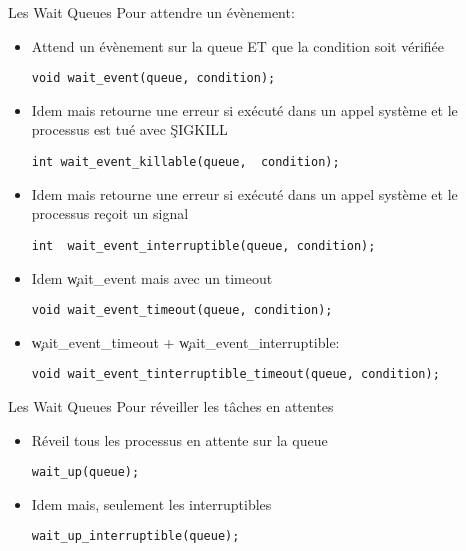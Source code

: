 \begin{frame}[fragile=singleslide]{Les Wait Queues}
  Pour attendre un évènement:
    \begin{itemize}
    \item Attend  un évènement sur la  queue ET que  la condition soit
      vérifiée
      \begin{lstlisting}
void wait_event(queue, condition);
      \end{lstlisting}
    \item  Idem mais  retourne une  erreur  si exécuté  dans un  appel
      système et le processus est tué avec \c{SIGKILL}
      \begin{lstlisting}
int wait_event_killable(queue,  condition);
      \end{lstlisting}
    \item  Idem mais  retourne une  erreur  si exécuté  dans un  appel
      système et le processus reçoit un signal
      \begin{lstlisting}
int  wait_event_interruptible(queue, condition);
      \end{lstlisting}
    \item   Idem \c{wait_event} mais avec un timeout
      \begin{lstlisting}
void wait_event_timeout(queue, condition);
      \end{lstlisting}
    \item \c{wait_event_timeout} + \c{wait_event_interruptible}:
      \begin{lstlisting}
void wait_event_tinterruptible_timeout(queue, condition);
      \end{lstlisting}
    \end{itemize}
\end{frame}

\begin{frame}[fragile=singleslide]{Les Wait Queues}
  Pour réveiller les tâches en attentes
    \begin{itemize}
    \item Réveil tous les processus en attente sur la queue
      \begin{lstlisting}
wait_up(queue);
      \end{lstlisting}
    \item Idem mais, seulement les interruptibles
      \begin{lstlisting}
wait_up_interruptible(queue);
      \end{lstlisting}
    \end{itemize}
\end{frame}

